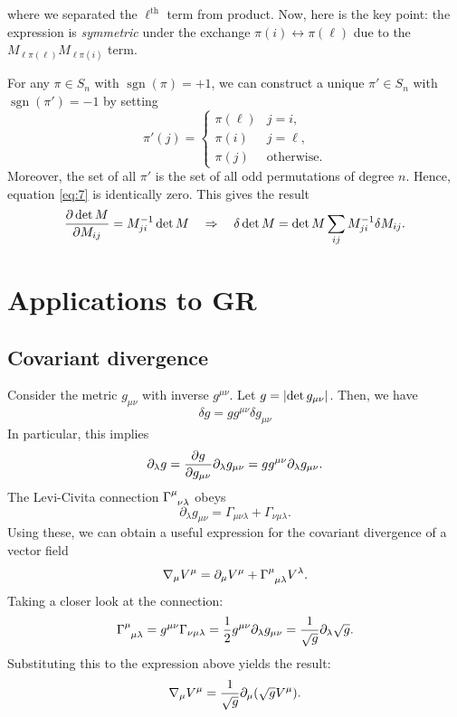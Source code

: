 \documentclass{article}
\DeclareMathOperator{\sgn}{sgn}
\begin{document}
where we separated the $ \ell^{\text{th}}$ term from product. Now, here is the key point: the expression is \textit{symmetric} under the exchange $ \pi(i) \leftrightarrow \pi(\ell) $ due to the $ M_{\ell \pi(\ell)}M_{\ell \pi(i)} $ term. 
\par
For any $ \pi \in S_{n} $ with $ \sgn(\pi) = +1 $, we can construct a unique $ \pi' \in S_{n} $ with $ \sgn(\pi') = -1 $ by setting
\begin{equation}
	\pi'(j) = \begin{cases}
	\pi(\ell) & j = i, \\
	\pi(i) & j = \ell, \\
	\pi(j) & \text{otherwise}.
	\end{cases}
\end{equation}
Moreover, the set of all $ \pi' $ is the set of all odd permutations of degree $ n $. Hence, equation \eqref{eq:7} is identically zero. This gives the result
\begin{equation}
	\pdv{\det M}{M_{ij}} = M^{-1}_{ji} \det M \quad\Rightarrow\quad \delta \det M = \det M \sum_{ij} M^{-1}_{ji} \delta M_{ij}.
\end{equation}
\section{Applications to GR}
\subsection{Covariant divergence}
Consider the metric $ g_{\mu \nu} $ with inverse $ g^{\mu \nu} $. Let $ g = \abs{\det g_{\mu \nu}} $. Then, we have
\begin{equation}
	\delta g = g g^{\mu \nu} \delta g_{\mu \nu}
\end{equation}
In particular, this implies
\begin{equation}
	\partial_{\lambda} g = \pdv{g}{g_{\mu \nu}} \partial_{\lambda} g_{\mu \nu} = g g^{\mu \nu} \partial_{\lambda} g_{\mu \nu}.
\end{equation}
The Levi-Civita connection $ \Gamma\indices{^{\mu}_{\nu \lambda}} $ obeys
\begin{equation}
	\partial_{\lambda} g_{\mu \nu} = \Gamma_{\mu \nu \lambda} + \Gamma_{\nu \mu \lambda}.
\end{equation}
Using these, we can obtain a useful expression for the covariant divergence of a vector field
\begin{equation}
	\nabla_{\mu} V^{\mu} = \partial_{\mu} V^{\mu} + \Gamma\indices{^{\mu}_{\mu \lambda}} V^{\lambda}.
\end{equation}
Taking a closer look at the connection:
\begin{equation}
	\Gamma\indices{^{\mu}_{\mu \lambda}} =  g^{\mu \nu} \Gamma_{\nu \mu \lambda} = \frac{1}{2} g^{\mu \nu} \partial_{\lambda} g_{\mu\nu} = \frac{1}{\sqrt{g}}\partial_{\lambda} \sqrt{g}.
\end{equation}
Substituting this to the expression above yields the result:
\begin{equation} \label{eq:covdiv}
	\nabla_{\mu} V^{\mu} = \frac{1}{\sqrt{g}} \partial_{\mu} \qty(\sqrt{g}V^{\mu}).
\end{equation}
\end{document}
